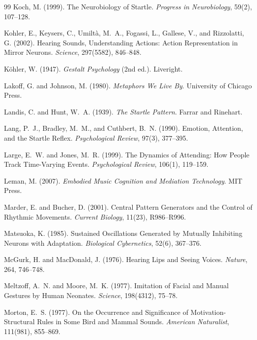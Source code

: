 \documentclass[11pt]{article}
\theoremstyle{plain}
\theoremstyle{definition}
\begin{document}
\begin{thebibliography}{99}
Koch, M. (1999).
The Neurobiology of Startle.
\textit{Progress in Neurobiology}, 59(2), 107--128.

Kohler, E., Keysers, C., Umilt\`a, M.~A., Fogassi, L., Gallese, V., and Rizzolatti, G. (2002).
Hearing Sounds, Understanding Actions: Action Representation in Mirror Neurons.
\textit{Science}, 297(5582), 846--848.

K\"ohler, W. (1947).
\textit{Gestalt Psychology} (2nd ed.).
Liveright.

Lakoff, G. and Johnson, M. (1980).
\textit{Metaphors We Live By}.
University of Chicago Press.

Landis, C. and Hunt, W.~A. (1939).
\textit{The Startle Pattern}.
Farrar and Rinehart.

Lang, P.~J., Bradley, M.~M., and Cuthbert, B.~N. (1990).
Emotion, Attention, and the Startle Reflex.
\textit{Psychological Review}, 97(3), 377--395.

Large, E.~W. and Jones, M.~R. (1999).
The Dynamics of Attending: How People Track Time-Varying Events.
\textit{Psychological Review}, 106(1), 119--159.

Leman, M. (2007).
\textit{Embodied Music Cognition and Mediation Technology}.
MIT Press.

Marder, E. and Bucher, D. (2001).
Central Pattern Generators and the Control of Rhythmic Movements.
\textit{Current Biology}, 11(23), R986--R996.

Matsuoka, K. (1985).
Sustained Oscillations Generated by Mutually Inhibiting Neurons with Adaptation.
\textit{Biological Cybernetics}, 52(6), 367--376.

McGurk, H. and MacDonald, J. (1976).
Hearing Lips and Seeing Voices.
\textit{Nature}, 264, 746--748.

Meltzoff, A.~N. and Moore, M.~K. (1977).
Imitation of Facial and Manual Gestures by Human Neonates.
\textit{Science}, 198(4312), 75--78.

Morton, E.~S. (1977).
On the Occurrence and Significance of Motivation-Structural Rules in Some Bird and Mammal Sounds.
\textit{American Naturalist}, 111(981), 855--869.


\end{thebibliography}
\end{document}
